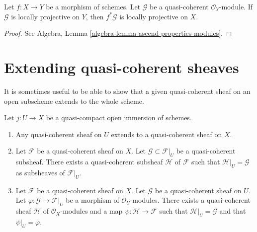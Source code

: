 \begin{lemma}
\label{lemma-locally-projective-pullback}
Let $f : X \to Y$ be a morphism of schemes.
Let $\mathcal{G}$ be a quasi-coherent $\mathcal{O}_Y$-module.
If $\mathcal{G}$ is locally projective on $Y$, then $f^*\mathcal{G}$
is locally projective on $X$.
\end{lemma}

\begin{proof}
See
Algebra, Lemma \ref{algebra-lemma-ascend-properties-modules}.
\end{proof}






\section{Extending quasi-coherent sheaves}
\label{section-extending-quasi-coherent-sheaves}

\noindent
It is sometimes useful to be able to show that a given quasi-coherent
sheaf on an open subscheme extends to the whole scheme.

\begin{lemma}
\label{lemma-extend-trivial}
Let $j : U \to X$ be a quasi-compact open immersion of schemes.
\begin{enumerate}
\item Any quasi-coherent sheaf on $U$ extends to a quasi-coherent
sheaf on $X$.
\item Let $\mathcal{F}$ be a quasi-coherent sheaf on $X$.
Let $\mathcal{G} \subset \mathcal{F}|_U$ be a quasi-coherent
subsheaf. There exists a quasi-coherent subsheaf $\mathcal{H}$ of
$\mathcal{F}$ such that $\mathcal{H}|_U = \mathcal{G}$
as subsheaves of $\mathcal{F}|_U$.
\item Let $\mathcal{F}$ be a quasi-coherent sheaf on $X$.
Let $\mathcal{G}$ be a quasi-coherent sheaf on $U$.
Let $\varphi : \mathcal{G} \to \mathcal{F}|_U$ be a morphism
of $\mathcal{O}_U$-modules. There exists a quasi-coherent sheaf $\mathcal{H}$
of $\mathcal{O}_X$-modules and a map $\psi : \mathcal{H} \to \mathcal{F}$
such that $\mathcal{H}|_U = \mathcal{G}$ and that
$\psi|_U = \varphi$.
\end{enumerate}
\end{lemma}

